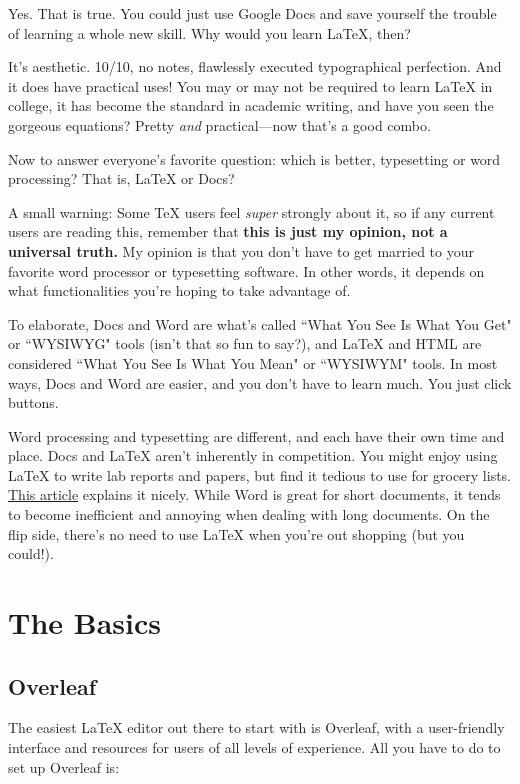 \documentclass[letterpaper, 12pt]{article}
\begin{document}
Yes. That is true. You could just use Google Docs and save yourself the trouble of learning a whole new skill. Why would you learn \LaTeX{}, then?

It's aesthetic. 10/10, no notes, flawlessly executed typographical perfection. And it does have practical uses! You may or may not be required to learn \LaTeX{} in college, it has become the standard in academic writing, and have you seen the gorgeous equations? Pretty \textit{and} practical---now that's a good combo.

Now to answer everyone's favorite question: which is better, typesetting or word processing? That is, \LaTeX{} or Docs?

A small warning: Some \TeX{} users feel \textit{super} strongly about it, so if any current users are reading this, remember that \textbf{this is just my opinion, not a universal truth.} My opinion is that you don't have to get married to your favorite word processor or typesetting software. In other words, it depends on what functionalities you're hoping to take advantage of.

To elaborate, Docs and Word are what's called ``What You See Is What You Get" or ``WYSIWYG" tools (isn't that so fun to say?), and \LaTeX{} and HTML are considered ``What You See Is What You Mean" or ``WYSIWYM" tools. In most ways, Docs and Word are easier, and you don't have to learn much. You just click buttons.

Word processing and typesetting are different, and each have their own time and place. Docs and \LaTeX{} aren't inherently in competition. You might enjoy using \LaTeX{} to write lab reports and papers, but find it tedious to use for grocery lists. \href{https://programmingforresearch.wordpress.com/2012/03/23/word-processor-versus-typesetter-2/}{This article} explains it nicely. While Word is great for short documents, it tends to become inefficient and annoying when dealing with long documents. On the flip side, there's no need to use \LaTeX{} when you're out shopping (but you could!).

\newpage

\section{The Basics}

\subsection{Overleaf}
The easiest \LaTeX{} editor out there to start with is Overleaf, with a user-friendly interface and resources for users of all levels of experience. All you have to do to set up Overleaf is:
\end{document}
